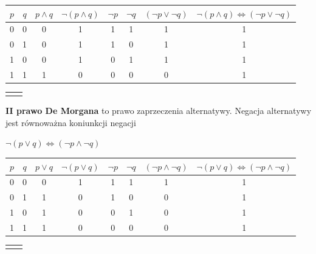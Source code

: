 \documentclass[a4paper,12pt]{article}
\begin{document}
\begin{table}[h!]
\centering

\begin{minipage}{15cm}
\centering

\begin{tabular}{ | c | c || c | c || c | c | c || c | }
  \hline
  $p$ & $q$ & $p \land q$ & $\lnot (p \land q)$ & $\lnot p$ & $\lnot q$ & $(\lnot p \lor \lnot q)$ & $\lnot (p \land q) \iff (\lnot p \lor \lnot q)$ \\ \hline
  0 & 0 & 0 & 1 & 1 & 1 & 1 & 1 \\
  0 & 1 & 0 & 1 & 1 & 0 & 1 & 1 \\
  1 & 0 & 0 & 1 & 0 & 1 & 1 & 1 \\
  1 & 1 & 1 & 0 & 0 & 0 & 0 & 1 \\
  \hline
\end{tabular}

\end{minipage}
\begin{minipage}{0.5cm}
\begin{tabular}{  c r }
  & \\
\end{tabular}
\end{minipage}
\end{table}


\textbf{II prawo De Morgana} to prawo zaprzeczenia alternatywy. Negacja alternatywy jest równoważna koniunkcji negacji


$\lnot (p \lor q) \iff (\lnot p \land \lnot q)$

\begin{table}[h!]
\centering

\begin{minipage}{15cm}
\centering

\begin{tabular}{ | c | c || c | c || c | c | c || c | }
  \hline
  $p$ & $q$ & $p \lor q$ & $\lnot (p \lor q)$ & $\lnot p$ & $\lnot q$ & $(\lnot p \land \lnot q)$ & $\lnot (p \lor q) \iff (\lnot p \land \lnot q)$ \\ \hline
  0 & 0 & 0 & 1 & 1 & 1 & 1 & 1 \\
  0 & 1 & 1 & 0 & 1 & 0 & 0 & 1 \\
  1 & 0 & 1 & 0 & 0 & 1 & 0 & 1 \\
  1 & 1 & 1 & 0 & 0 & 0 & 0 & 1 \\
  \hline
\end{tabular}

\end{minipage}
\begin{minipage}{0.5cm}
\begin{tabular}{  c r }
  & \\
\end{tabular}
\end{minipage}
\end{table}
\end{document}
